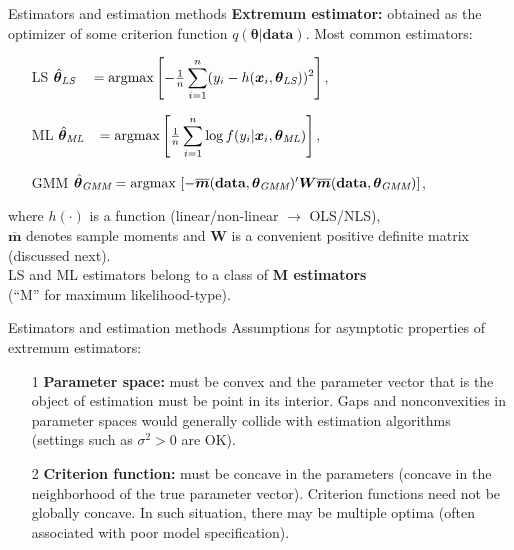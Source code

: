 \documentclass{beamer}
\begin{document}
\begin{frame}{Estimators and estimation methods}
\textbf{Extremum estimator:} obtained as the optimizer of some criterion function $q(\bm{\theta}|\textbf{data})$. Most common estimators:
\medskip
\begin{itemize}
    \item[LS] $\hat{\bm{\theta}}_{\textit{LS}}~~~=\textnormal{argmax}\left[ -\frac{1}{n} \displaystyle\sum_{i=1}^n (y_i - h(\bm{x}_i,\bm{\theta}_{\textit{LS}}))^2\right]$,
    \item[ML] $\hat{\bm{\theta}}_{\textit{ML}}~~\,=\textnormal{argmax}\left[ \frac{1}{n} \displaystyle\sum_{i=1}^n \log f(y_i|\bm{x}_i,\bm{\theta}_{\textit{ML}})\right]$,
    \item[GMM] $\hat{\bm{\theta}}_{\textit{GMM}}=\textnormal{argmax}\,\left[ -\overline{\bm{m}}(\textbf{data},\bm{\theta}_{\textit{GMM}})^{\prime}\bm{W}\overline{\bm{m}} (\textbf{data},\bm{\theta}_{\textit{GMM}})\right]$,
\end{itemize}
\medskip
where $h(\cdot)$ is a function (linear/non-linear $\rightarrow$ OLS/NLS), \\$\overline{\bm{m}}$ denotes sample moments and $\bm{W}$ is a convenient positive definite matrix (discussed next).\\
\medskip
LS and ML estimators belong to a class of \textbf{M estimators} \\(``M'' for maximum likelihood-type).
\end{frame}
\begin{frame}{Estimators and estimation methods}
Assumptions for asymptotic properties of extremum estimators:
\medskip
\begin{itemize}
    \item[1] \textbf{Parameter space:} must be convex and the parameter vector that is the object of estimation must be point in its interior. Gaps and nonconvexities in parameter spaces would generally collide with estimation algorithms \\(settings such as $\sigma^2 > 0$ are OK).
    \medskip
    \item[2] \textbf{Criterion function:} must be concave in the parameters (concave in the neighborhood of the true parameter vector). Criterion functions need not be globally concave. In such situation, there may be multiple optima (often associated with poor model specification).
\end{itemize}
\end{frame}
\end{document}
